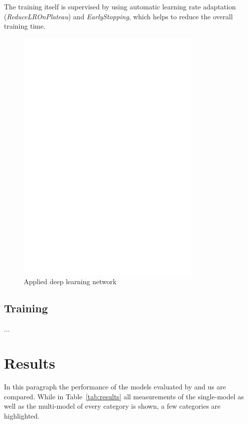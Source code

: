 \documentclass[11pt,a4paper]{article}
\begin{document}
The training itself is supervised by using automatic learning rate adaptation (\textit{ReduceLROnPlateau}) and \textit{EarlyStopping}, which helps to reduce the overall training time.
\begin{figure}
	\centering
	\includegraphics[trim={0cm 19.5cm 0cm 3cm},clip,page=2, width=0.8\textwidth]{img/model}
	\caption{Applied deep learning network}
	\label{fig:model}
\end{figure}


\subsection{Training}

...


\section{Results}
In this paragraph the performance of the models evaluated by  and us are compared.
While in Table~\ref{tab:results} all measurements of the single-model as well as the multi-model of every category is shown, a few categories are highlighted.
\end{document}
